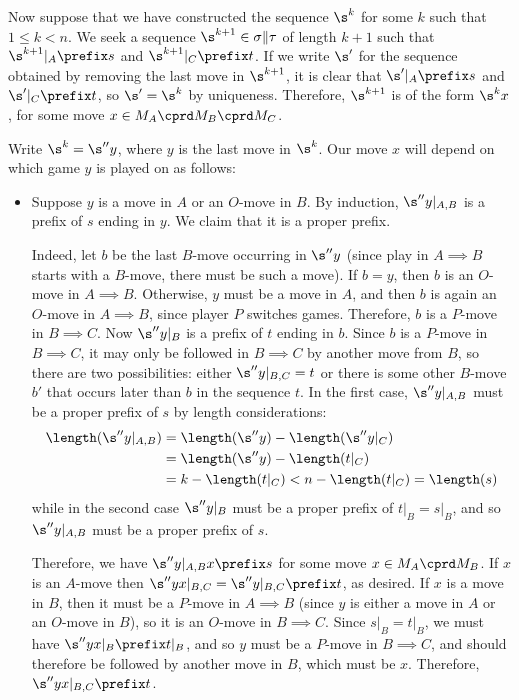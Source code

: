 \documentclass[11pt]{article} %
\begin{document}
Now suppose that we have constructed the sequence $\s^k$ for some $k$ such that $1\le k<n$.  We seek a sequence $\s^{k+1}\in \sigma\|\tau$ of length $k+1$ such that $\s^{k+1}\vert_A\prefix s$ and $\s^{k+1}\vert_C\prefix t$.  If we write $\s'$ for the sequence obtained by removing the last move in $\s^{k+1}$, it is clear that $\s'\vert_A\prefix s$ and $\s'\vert_C\prefix t$, so $\s'=\s^k$ by uniqueness.  Therefore, $\s^{k+1}$ is of the form $\s^kx$, for some move $x\in M_A\cprd M_B\cprd M_C$.  

Write $\s^k=\s''y$, where $y$ is the last move in $\s^k$.  Our move $x$ will depend on which game $y$ is played on as follows:

\begin{itemize}
  \item Suppose $y$ is a move in $A$ or an $O$-move in $B$.  By induction, $\s''y\vert_{A,B}$ is a prefix of $s$ ending in $y$.  We claim that it is a proper prefix.  

    Indeed, let $b$ be the last $B$-move occurring in $\s''y$ (since play in $A\implies B$ starts with a $B$-move, there must be such a move).  If $b=y$, then $b$ is an $O$-move in $A\implies B$.  Otherwise, $y$ must be a move in $A$, and then $b$ is again an $O$-move in $A\implies B$, since player $P$ switches games.  Therefore, $b$ is a $P$-move in $B\implies C$.  Now $\s''y\vert_B$ is a prefix of $t$ ending in $b$.  Since $b$ is a $P$-move in $B\implies C$, it may only be followed in $B\implies C$ by another move from $B$, so there are two possibilities: either $\s''y\vert_{B,C}=t$ or there is some other $B$-move $b'$ that occurs later than $b$ in the sequence $t$.  In the first case, $\s''y\vert_{A,B}$ must be a proper prefix of $s$ by length considerations:
    \begin{align*}
      \length(\s''y\vert_{A,B}) & = \length(\s''y) - \length(\s''y\vert_C) \\
        & = \length(\s''y) - \length(t\vert_C) \\
        & = k - \length(t\vert_C) < n - \length(t\vert_C) = \length(s)
    \end{align*}
    while in the second case $\s''y\vert_B$ must be a proper prefix of $t\vert_B=s\vert_B$, and so $\s''y\vert_{A,B}$ must be a proper prefix of $s$.

    Therefore, we have $\s''y\vert_{A,B}x\prefix s$ for some move $x\in M_A\cprd M_B$.  If $x$ is an $A$-move then $\s''yx\vert_{B,C}=\s''y\vert_{B,C}\prefix t$, as desired.  If $x$ is a move in $B$, then it must be a $P$-move in $A\implies B$ (since $y$ is either a move in $A$ or an $O$-move in $B$), so it is an $O$-move in $B\implies C$.  Since $s\vert_B=t\vert_B$, we must have $\s''yx\vert_B\prefix t\vert_B$, and so $y$ must be a $P$-move in $B\implies C$, and should therefore be followed by another move in $B$, which must be $x$.  Therefore, $\s''yx\vert_{B,C}\prefix t$.


\end{itemize}
\end{document}
